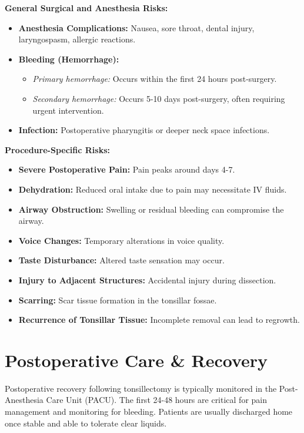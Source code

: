\textbf{General Surgical and Anesthesia Risks:}
\begin{itemize}
  \item \textbf{Anesthesia Complications:} Nausea, sore throat, dental injury, laryngospasm, allergic reactions.
  \item \textbf{Bleeding (Hemorrhage):}
    \begin{itemize}
      \item \textit{Primary hemorrhage:} Occurs within the first 24 hours post-surgery.
      \item \textit{Secondary hemorrhage:} Occurs 5-10 days post-surgery, often requiring urgent intervention.
    \end{itemize}
  \item \textbf{Infection:} Postoperative pharyngitis or deeper neck space infections.
\end{itemize}

\textbf{Procedure-Specific Risks:}
\begin{itemize}
  \item \textbf{Severe Postoperative Pain:} Pain peaks around days 4-7.
  \item \textbf{Dehydration:} Reduced oral intake due to pain may necessitate IV fluids.
  \item \textbf{Airway Obstruction:} Swelling or residual bleeding can compromise the airway.
  \item \textbf{Voice Changes:} Temporary alterations in voice quality.
  \item \textbf{Taste Disturbance:} Altered taste sensation may occur.
  \item \textbf{Injury to Adjacent Structures:} Accidental injury during dissection.
  \item \textbf{Scarring:} Scar tissue formation in the tonsillar fossae.
  \item \textbf{Recurrence of Tonsillar Tissue:} Incomplete removal can lead to regrowth.
\end{itemize}

\section*{Postoperative Care \& Recovery}
Postoperative recovery following tonsillectomy is typically monitored in the Post-Anesthesia Care Unit (PACU). The first 24-48 hours are critical for pain management and monitoring for bleeding. Patients are usually discharged home once stable and able to tolerate clear liquids.

